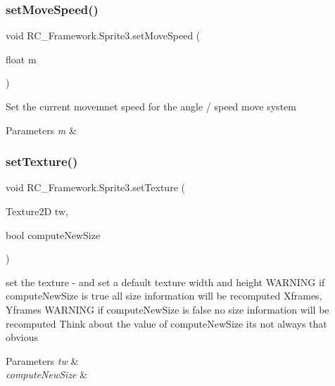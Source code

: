 \subsubsection{\texorpdfstring{set\+Move\+Speed()}{setMoveSpeed()}}
{\footnotesize\ttfamily void R\+C\+\_\+\+Framework.\+Sprite3.\+set\+Move\+Speed (\begin{DoxyParamCaption}\item[{float}]{m }\end{DoxyParamCaption})}



Set the current movemnet speed for the angle / speed move system 


\begin{DoxyParams}{Parameters}
{\em m} & \\
\hline
\end{DoxyParams}
\mbox{\label{class_r_c___framework_1_1_sprite3_a95f9492fffdbd603d9aa087b4bc108f4}} 
\subsubsection{\texorpdfstring{set\+Texture()}{setTexture()}}
{\footnotesize\ttfamily void R\+C\+\_\+\+Framework.\+Sprite3.\+set\+Texture (\begin{DoxyParamCaption}\item[{Texture2D}]{tw,  }\item[{bool}]{compute\+New\+Size }\end{DoxyParamCaption})}



set the texture -\/ and set a default texture width and height W\+A\+R\+N\+I\+NG if compute\+New\+Size is true all size information will be recomputed Xframes, Yframes W\+A\+R\+N\+I\+NG if compute\+New\+Size is false no size information will be recomputed Think about the value of compute\+New\+Size its not always that obvious 


\begin{DoxyParams}{Parameters}
{\em tw} & \\
\hline
{\em compute\+New\+Size} & \\
\hline
\end{DoxyParams}
\mbox{\label{class_r_c___framework_1_1_sprite3_abb634dc79e4094b58b566ef7d8aca35b}} 
